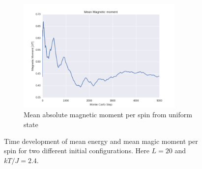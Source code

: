 \documentclass[a4paper, 10pt]{article}
\begin{document}
\begin{figure}[!ht]
    ~ 
    \begin{subfigure}[H!]{0.5\textwidth}
        \centering
        \includegraphics[height=2.2in]{meanMagMomWUpStartT24.png}
        \caption{Mean absolute magnetic moment per spin from uniform state}
    \end{subfigure}
      \caption{Time development of mean energy and mean magic moment per spin for two different initial configurations. Here $L=20$ and $kT/J=2.4$.}\label{fig:20x20_Sweep_T_24}
\end{figure}
\end{document}
